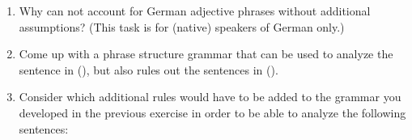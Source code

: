 {\begin{enumerate}
Revisit the German data in (\ref{ex-nounless-np}) and (\ref{ex-nounless-np-relational-noun})  and
explain why such an analysis and even a more general one as in () would
not extend to German.
\ea
NP $\to$ Det Adj
\z



\item Why can \xbart not account for German adjective phrases without additional assumptions? (This
  task is for (native) speakers of German only.)

\item Come up with a phrase structure grammar that can be used to analyze the sentence in (), but also
rules out the sentences in ().

      \eal
      \zl%
      \eal
      \zl
\item Consider which additional rules would have to be added to the grammar you developed in the previous exercise
	  in order to be able to analyze the following sentences:


\end{enumerate}}
